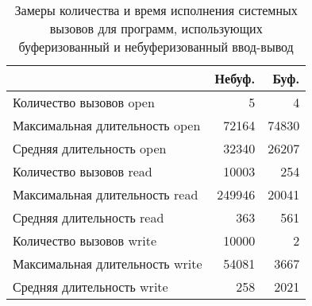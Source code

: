 \begin{table}[h!]
\label{tbl:res}
\caption{Замеры количества и время исполнения системных вызовов для программ, использующих буферизованный и небуферизованный ввод-вывод}
\begin{tabular}{|l|r|r|}
\hline
                                & Небуф. & Буф. \\ \hline
Количество вызовов open         & 5                                           & 4                                         \\ \hline
Максимальная длительность open  & 72164                                       & 74830                                     \\ \hline
Средняя длительность open       & 32340                                       & 26207                                     \\ \hline
Количество вызовов read         & 10003                                       & 254                                       \\ \hline
Максимальная длительность read  & 249946                                      & 20041                                     \\ \hline
Средняя длительность read       & 363                                         & 561                                       \\ \hline
Количество вызовов write        & 10000                                       & 2                                         \\ \hline
Максимальная длительность write & 54081                                            & 3667                                      \\ \hline
Средняя длительность write      & 258                                         & 2021                                      \\ \hline
\end{tabular}
\end{table}